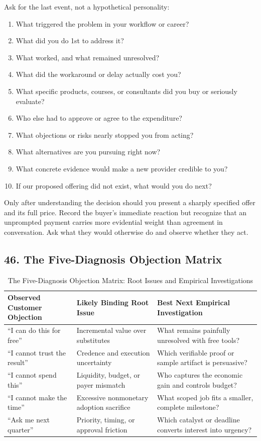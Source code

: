 Ask for the last event, not a hypothetical personality:
\begin{enumerate}
\item What triggered the problem in your workflow or career?
\item What did you do 1st to address it?
\item What worked, and what remained unresolved?
\item What did the workaround or delay actually cost you?
\item What specific products, courses, or consultants did you buy or seriously evaluate?
\item Who else had to approve or agree to the expenditure?
\item What objections or risks nearly stopped you from acting?
\item What alternatives are you pursuing right now?
\item What concrete evidence would make a new provider credible to you?
\item If our proposed offering did not exist, what would you do next?
\end{enumerate}

Only after understanding the decision should you present a sharply specified offer and its full price. Record the buyer's immediate reaction but recognize that an unprompted payment carries more evidential weight than agreement in conversation. Ask what they would otherwise do and observe whether they act.

\subsection*{46. The Five-Diagnosis Objection Matrix}

\begin{table}[t]
\centering
\small
\caption{The Five-Diagnosis Objection Matrix: Root Issues and Empirical Investigations}
\begin{tabularx}{\textwidth}{p{}p{}X}
\toprule
\textbf{Observed Customer Objection} & \textbf{Likely Binding Root Issue} & \textbf{Best Next Empirical Investigation} \\
\midrule
``I can do this for free'' & Incremental value over substitutes & What remains painfully unresolved with free tools? \\
``I cannot trust the result'' & Credence and execution uncertainty & Which verifiable proof or sample artifact is persuasive? \\
``I cannot spend this'' & Liquidity, budget, or payer mismatch & Who captures the economic gain and controls budget? \\
``I cannot make the time'' & Excessive nonmonetary adoption sacrifice & What scoped job fits a smaller, complete milestone? \\
``Ask me next quarter'' & Priority, timing, or approval friction & Which catalyst or deadline converts interest into urgency? \\
\bottomrule
\end{tabularx}
\end{table}

